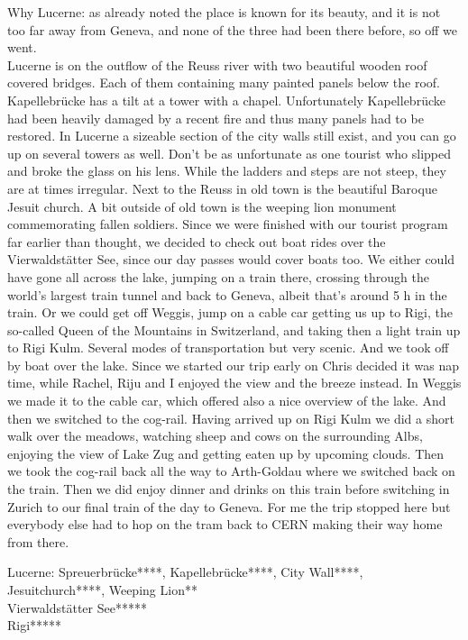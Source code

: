 Why Lucerne: as already noted the place is known for its beauty, and it is not too far away from Geneva, and none of the three had been there before, so off we went.\\

Lucerne is on the outflow of the Reuss river with two beautiful wooden roof covered bridges. Each of them containing many painted panels below the roof. Kapellebr\"ucke has a tilt at a tower with a chapel. Unfortunately Kapellebr\"ucke had been heavily damaged by a recent fire and thus many panels had to be restored. In Lucerne a sizeable section of the city walls still exist, and you can go up on several towers as well. Don't be as unfortunate as one tourist who slipped and broke the glass on his lens. While the ladders and steps are not steep, they are at times irregular. Next to the Reuss in old town is the beautiful Baroque Jesuit church. A bit outside of old town is the weeping lion monument commemorating fallen soldiers. Since we were finished with our tourist program far earlier than thought, we decided to check out boat rides over the Vierwaldst\"atter See, since our day passes would cover boats too. We either could have gone all across the lake, jumping on a train there, crossing through the world's largest train tunnel and back to Geneva, albeit that's around 5 h in the train. Or we could get off Weggis, jump on a cable car getting us up to Rigi, the so-called Queen of the Mountains in Switzerland, and taking then a light train up to Rigi Kulm. Several modes of transportation but very scenic. And we took off by boat over the lake. Since we started our trip early on Chris decided it was nap time, while Rachel, Riju and I enjoyed the view and the breeze instead. In Weggis we made it to the cable car, which offered also a nice overview of the lake. And then we switched to the cog-rail. Having arrived up on Rigi Kulm we did a short walk over the meadows, watching sheep and cows on the surrounding Albs, enjoying the view of Lake Zug and getting eaten up by upcoming clouds. Then we took the cog-rail back all the way to Arth-Goldau where we switched back on the train. Then we did enjoy dinner and drinks on this train before switching in Zurich to our final train of the day to Geneva. For me the trip stopped here but everybody else had to hop on the tram back to CERN making their way home from there.

Lucerne: Spreuerbr\"ucke****, Kapellebr\"ucke****, City Wall****, Jesuitchurch****, Weeping Lion**\\
Vierwaldst\"atter See*****\\
Rigi*****\\

